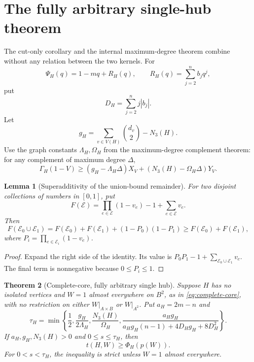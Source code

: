 \documentclass[11pt]{article}
\newtheorem{theorem}{Theorem}[section]
\newtheorem{lemma}[theorem]{Lemma}
\begin{document}
\section{The fully arbitrary single-hub theorem}

The cut-only corollary and the internal maximum-degree theorem combine without
any relation between the two kernels.  For
\[
 \Psi_H(q)=1-mq+R_H(q),
 \qquad R_H(q)=\sum_{j=2}^nb_jq^j,
\]
put
\begin{equation}
 D_H=\sum_{j=2}^n j|b_j|.
 \label{eq:derivative-norm}
\end{equation}
Let
\[
 g_H=\sum_{v\in V(H)}\binom{d_v}{2}-N_3(H).
\]
Use the graph constants $\Lambda_H,\Omega_H$ from the maximum-degree
complement theorem: for any complement of maximum degree $\Delta$,
\begin{equation}
 \Gamma_H(1-V)\geq
 (g_H-\Lambda_H\Delta)X_V
 +(N_3(H)-\Omega_H\Delta)Y_V.
 \label{eq:maximum-degree-input}
\end{equation}

\begin{lemma}[Superadditivity of the union-bound remainder]
\label{lem:superadditive}
For two disjoint collections of numbers in $[0,1]$, put
\[
 F(\mathcal E)=\prod_{e\in\mathcal E}(1-v_e)-1+
 \sum_{e\in\mathcal E}v_e.
\]
Then
\begin{equation}
 F(\mathcal E_0\cup\mathcal E_1)
 =F(\mathcal E_0)+F(\mathcal E_1)
 +(1-P_0)(1-P_1)\geq F(\mathcal E_0)+F(\mathcal E_1),
 \label{eq:superadditive}
\end{equation}
where $P_i=\prod_{e\in\mathcal E_i}(1-v_e)$.
\end{lemma}

\begin{proof}
Expand the right side of the identity.  Its value is
$P_0P_1-1+\sum_{\mathcal E_0\cup\mathcal E_1}v_e$.  The final term is
nonnegative because $0\leq P_i\leq1$.
\end{proof}

\begin{theorem}[Complete-core, fully arbitrary single hub]
\label{thm:complete-core}
Suppose $H$ has no isolated vertices and $W=1$ almost everywhere on $B^2$, as in
\eqref{eq:complete-core}, with no restriction on either $W|_{A\times B}$ or
$W|_{A^2}$.  Put $a_H=2m-n$ and
\begin{equation}
 \tau_H=\min\left\{
 \frac12,
 \frac{g_H}{2\Lambda_H},
 \frac{N_3(H)}{\Omega_H},
 \frac{a_Hg_H}
 {a_Hg_H(n-1)+4D_Hg_H+8D_H^2}
 \right\}.
 \label{eq:complete-core-radius}
\end{equation}
If $a_H,g_H,N_3(H)>0$ and $0\leq s\leq\tau_H$, then
\[
 t(H,W)\geq\Phi_H(p(W)).
\]
For $0<s<\tau_H$, the inequality is strict unless $W=1$ almost everywhere.
\end{theorem}
\end{document}
